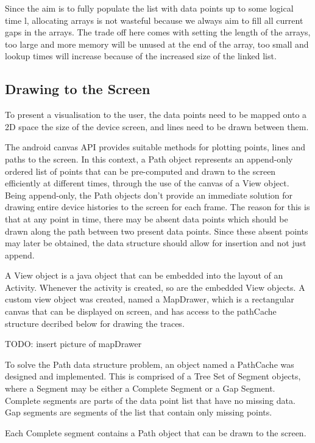 Since the aim is to fully populate the list with data points up to some logical time l, allocating arrays is not wasteful because we always aim to fill all current gaps in the arrays. The trade off here comes with setting the length of the arrays, too large and more memory will be unused at the end of the array, too small and lookup times will increase because of the increased size of the linked list.

\subsection{Drawing to the Screen}

To present a visualisation to the user, the data points need to be mapped onto a 2D space the size of the device screen, and lines need to be drawn between them.

The android canvas API provides suitable methods for plotting points, lines and paths to the screen. In this context, a Path object represents an append-only ordered list of points that can be pre-computed and drawn to the screen efficiently at different times, through the use of the canvas of a View object.
Being append-only, the Path objects don't provide an immediate solution for drawing entire device histories to the screen for each frame. The reason for this is that at any point in time, there may be absent data points which should be drawn along the path between two present data points. Since these absent points may later be obtained, the data structure should allow for insertion and not just append.

A View object is a java object that can be embedded into the layout of an Activity. Whenever the activity is created, so are the embedded View objects. A custom view object was created, named a MapDrawer, which is a rectangular canvas that can be displayed on screen, and has access to the pathCache structure decribed below for drawing the traces.

TODO: insert picture of mapDrawer

To solve the Path data structure problem, an object named a PathCache was designed and implemented. This is comprised of a Tree Set of Segment objects, where a Segment may be either a Complete Segment or a Gap Segment. Complete segments are parts of the data point list that have no missing data. Gap segments are segments of the list that contain only missing points.

Each Complete segment contains a Path object that can be drawn to the screen.

